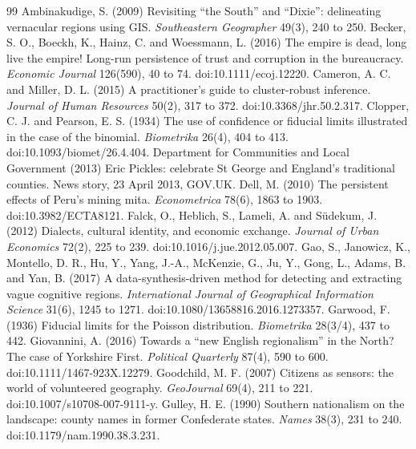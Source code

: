 \documentclass[11pt,a4paper]{article}
\begin{document}
\begin{thebibliography}{99}
 Ambinakudige, S. (2009) Revisiting ``the South'' and ``Dixie'': delineating vernacular regions using GIS. \textit{Southeastern Geographer} 49(3), 240 to 250.
 Becker, S. O., Boeckh, K., Hainz, C. and Woessmann, L. (2016) The empire is dead, long live the empire! Long-run persistence of trust and corruption in the bureaucracy. \textit{Economic Journal} 126(590), 40 to 74. doi:10.1111/ecoj.12220.
 Cameron, A. C. and Miller, D. L. (2015) A practitioner's guide to cluster-robust inference. \textit{Journal of Human Resources} 50(2), 317 to 372. doi:10.3368/jhr.50.2.317.
 Clopper, C. J. and Pearson, E. S. (1934) The use of confidence or fiducial limits illustrated in the case of the binomial. \textit{Biometrika} 26(4), 404 to 413. doi:10.1093/biomet/26.4.404.
 Department for Communities and Local Government (2013) Eric Pickles: celebrate St George and England's traditional counties. News story, 23 April 2013, GOV.UK.
 Dell, M. (2010) The persistent effects of Peru's mining mita. \textit{Econometrica} 78(6), 1863 to 1903. doi:10.3982/ECTA8121.
 Falck, O., Heblich, S., Lameli, A. and S\"udekum, J. (2012) Dialects, cultural identity, and economic exchange. \textit{Journal of Urban Economics} 72(2), 225 to 239. doi:10.1016/j.jue.2012.05.007.
 Gao, S., Janowicz, K., Montello, D. R., Hu, Y., Yang, J.-A., McKenzie, G., Ju, Y., Gong, L., Adams, B. and Yan, B. (2017) A data-synthesis-driven method for detecting and extracting vague cognitive regions. \textit{International Journal of Geographical Information Science} 31(6), 1245 to 1271. doi:10.1080/13658816.2016.1273357.
 Garwood, F. (1936) Fiducial limits for the Poisson distribution. \textit{Biometrika} 28(3/4), 437 to 442.
 Giovannini, A. (2016) Towards a ``new English regionalism'' in the North? The case of Yorkshire First. \textit{Political Quarterly} 87(4), 590 to 600. doi:10.1111/1467-923X.12279.
 Goodchild, M. F. (2007) Citizens as sensors: the world of volunteered geography. \textit{GeoJournal} 69(4), 211 to 221. doi:10.1007/s10708-007-9111-y.
 Gulley, H. E. (1990) Southern nationalism on the landscape: county names in former Confederate states. \textit{Names} 38(3), 231 to 240. doi:10.1179/nam.1990.38.3.231.

\end{thebibliography}
\end{document}

